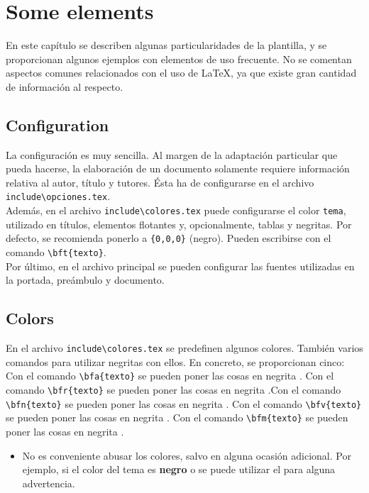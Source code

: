 \chapter{Some elements}

En este capítulo se describen algunas particularidades de la plantilla, y se proporcionan algunos ejemplos con elementos de uso frecuente. No se comentan aspectos comunes relacionados con el uso de \LaTeX, ya que existe gran cantidad de información al respecto.

\section{Configuration}
La configuración es muy sencilla. Al margen de la adaptación particular que pueda hacerse, la elaboración de un documento solamente requiere información relativa al autor, título y tutores. Ésta ha de configurarse en el archivo \verb+include\opciones.tex+.  \\

Además, en el archivo \verb+include\colores.tex+ puede configurarse el color \verb+tema+, utilizado en títulos, elementos flotantes y, opcionalmente, tablas y negritas. Por defecto, se recomienda ponerlo a \verb+{0,0,0}+  (negro). Pueden escribirse  con el comando \verb+\bft{texto}+. \\

Por último, en el archivo principal se pueden configurar las fuentes utilizadas en la portada, preámbulo y documento.

\section{Colors}


En el archivo \verb+include\colores.tex+ se predefinen algunos colores. También varios comandos para utilizar negritas con ellos. En concreto, se proporcionan cinco: Con el comando \verb+\bfa{texto}+ se pueden poner las cosas en negrita . Con el comando \verb+\bfr{texto}+ se pueden poner las cosas en negrita .Con el comando \verb+\bfn{texto}+ se pueden poner las cosas en negrita . Con el comando \verb+\bfv{texto}+ se pueden poner las cosas en negrita . Con el comando \verb+\bfm{texto}+ se pueden poner las cosas en negrita .\\

\begin{itemize}
\item [\hmarkr] No es conveniente abusar los colores, salvo en alguna ocasión adicional. Por ejemplo, si el color del tema es {\bf negro} o  se puede utilizar el  para alguna advertencia.
\end{itemize}

